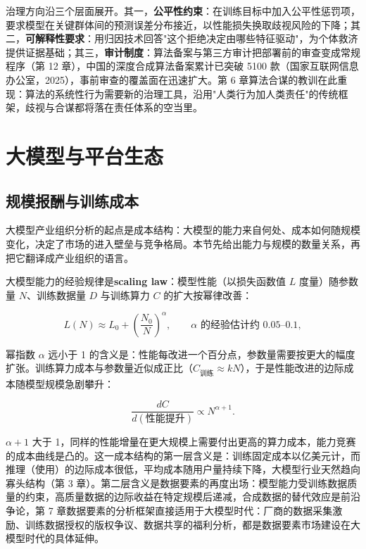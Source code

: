 治理方向沿三个层面展开。其一，\textbf{公平性约束}：在训练目标中加入公平性惩罚项，要求模型在关键群体间的预测误差分布接近，以性能损失换取歧视风险的下降；其二，\textbf{可解释性要求}：用归因技术回答"这个拒绝决定由哪些特征驱动"，为个体救济提供证据基础；其三，\textbf{审计制度}：算法备案与第三方审计把部署前的审查变成常规程序（第 12 章），中国的深度合成算法备案累计已突破 5100 款（国家互联网信息办公室，2025），事前审查的覆盖面在迅速扩大。第 6 章算法合谋的教训在此重现：算法的系统性行为需要新的治理工具，沿用"人类行为加人类责任"的传统框架，歧视与合谋都将落在责任体系的空当里。

\section{大模型与平台生态}

\subsection{规模报酬与训练成本}

大模型产业组织分析的起点是成本结构：大模型的能力来自何处、成本如何随规模变化，决定了市场的进入壁垒与竞争格局。本节先给出能力与规模的数量关系，再把它翻译成产业组织的语言。

大模型能力的经验规律是\textbf{scaling law}：模型性能（以损失函数值 $L$ 度量）随参数量 $N$、训练数据量 $D$ 与训练算力 $C$ 的扩大按幂律改善：

\[
L(N) \approx L_0 + \left(\frac{N_0}{N}\right)^{\alpha}, \qquad \alpha \text{ 的经验估计约 } 0.05\text{--}0.1,
\]

幂指数 $\alpha$ 远小于 1 的含义是：性能每改进一个百分点，参数量需要按更大的幅度扩张。训练算力成本与参数量近似成正比（$C_{\text{训练}} \approx k N$），于是性能改进的边际成本随模型规模急剧攀升：

\[
\frac{dC}{d(\text{性能提升})} \propto N^{\alpha+1}.
\]

$\alpha + 1$ 大于 1，同样的性能增量在更大规模上需要付出更高的算力成本，能力竞赛的成本曲线是凸的。这一成本结构的第一层含义是：训练固定成本以亿美元计，而推理（使用）的边际成本很低，平均成本随用户量持续下降，大模型行业天然趋向寡头结构（第 3 章）。第二层含义是数据要素的再度出场：模型能力受训练数据质量的约束，高质量数据的边际收益在特定规模后递减，合成数据的替代效应是前沿争论，第 7 章数据要素的分析框架直接适用于大模型时代：厂商的数据采集激励、训练数据授权的版权争议、数据共享的福利分析，都是数据要素市场建设在大模型时代的具体延伸。

